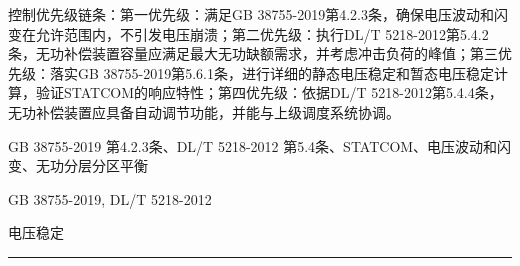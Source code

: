 \documentclass[12pt,a4paper]{ctexart}
\begin{document}
\begin{description}[leftmargin=1.5em,style=nextline,font=\normalfont]
控制优先级链条：第一优先级：满足GB 38755-2019第4.2.3条，确保电压波动和闪变在允许范围内，不引发电压崩溃；第二优先级：执行DL/T 5218-2012第5.4.2条，无功补偿装置容量应满足最大无功缺额需求，并考虑冲击负荷的峰值；第三优先级：落实GB 38755-2019第5.6.1条，进行详细的静态电压稳定和暂态电压稳定计算，验证STATCOM的响应特性；第四优先级：依据DL/T 5218-2012第5.4.4条，无功补偿装置应具备自动调节功能，并能与上级调度系统协调。
  \item[KW:] GB 38755-2019 第4.2.3条、DL/T 5218-2012 第5.4条、STATCOM、电压波动和闪变、无功分层分区平衡
  \item[Std:] GB 38755-2019, DL/T 5218-2012
  \item[Topic:] 电压稳定
\end{description}
\vspace{4pt}
\hrule\vspace{6pt}
\end{document}
